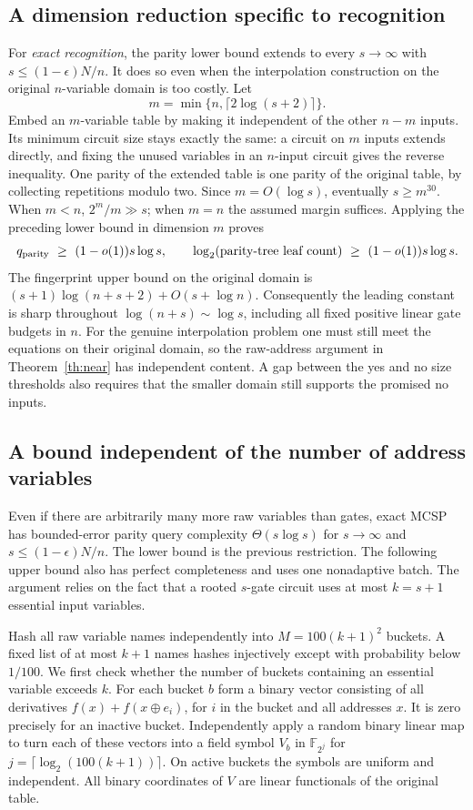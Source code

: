 \subsection{A dimension reduction specific to recognition}
For \emph{exact recognition}, the parity lower bound extends to every $s\to\infty$ with $s\le(1-\epsilon)N/n$. It does so even when the interpolation construction on the original $n$-variable domain is too costly. Let
\[
                  m=\min\{n,\lceil 2\log(s+2)\rceil\}.
\]
Embed an $m$-variable table by making it independent of the other $n-m$ inputs. Its minimum circuit size stays exactly the same: a circuit on $m$ inputs extends directly, and fixing the unused variables in an $n$-input circuit gives the reverse inequality. One parity of the extended table is one parity of the original table, by collecting repetitions modulo two. Since $m=O(\log s)$, eventually $s\ge m^{30}$. When $m<n$, $2^m/m\gg s$; when $m=n$ the assumed margin suffices. Applying the preceding lower bound in dimension $m$ proves
\[
 q_{\rm parity}\ \ge\ (1-o(1))s\log s,\qquad
 \log_2(\text{parity-tree leaf count})\ \ge\ (1-o(1))s\log s.
\]
The fingerprint upper bound on the original domain is $(s+1)\log(n+s+2)+O(s+\log n)$. Consequently the leading constant is sharp throughout $\log(n+s)\sim\log s$, including all fixed positive linear gate budgets in $n$. For the genuine interpolation problem one must still meet the equations on their original domain, so the raw-address argument in Theorem~\ref{th:near} has independent content. A gap between the yes and no size thresholds also requires that the smaller domain still supports the promised no inputs.

\subsection{A bound independent of the number of address variables}
Even if there are arbitrarily many more raw variables than gates, exact MCSP has bounded-error parity query complexity $\Theta(s\log s)$ for $s\to\infty$ and $s\le(1-\epsilon)N/n$. The lower bound is the previous restriction. The following upper bound also has perfect completeness and uses one nonadaptive batch. The argument relies on the fact that a rooted $s$-gate circuit uses at most $k=s+1$ essential input variables.

Hash all raw variable names independently into $M=100(k+1)^2$ buckets. A fixed list of at most $k+1$ names hashes injectively except with probability below $1/100$. We first check whether the number of buckets containing an essential variable exceeds $k$. For each bucket $b$ form a binary vector consisting of all derivatives $f(x)+f(x\mathbin{\oplus} e_i)$, for $i$ in the bucket and all addresses $x$. It is zero precisely for an inactive bucket. Independently apply a random binary linear map to turn each of these vectors into a field symbol $V_b$ in $\mathbb F_{2^j}$ for $j=\lceil\log_2(100(k+1))\rceil$. On active buckets the symbols are uniform and independent. All binary coordinates of $V$ are linear functionals of the original table.

